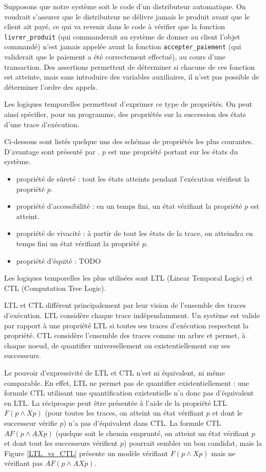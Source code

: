 Supposons que notre système soit le code d'un distributeur automatique.
On voudrait s'assurer que le distributeur ne délivre jamais le produit
avant que le client ait payé, ce qui va revenir dans le code à vérifier
que la fonction \lstinline!livrer_produit! (qui commanderait au système
de donner au client l'objet commandé) n'est jamais appelée avant la
fonction \lstinline!accepter_paiement! (qui validerait que le paiement a
été correctement effectué), au cours d'une transaction. Des assertions
permettent de déterminer si chacune de ces fonction est atteinte, mais
sans introduire des variables auxiliaires, il n'est pas possible de
déterminer l'ordre des appels.

Les logiques temporelles permettent d'exprimer ce type de propriétés. On
peut ainsi spécifier, pour un programme, des propriétés sur la
succession des états d'une trace d'exécution.

Ci-dessous sont listés quelque uns des schémas de propriétés les plus
courantes. D'avantage sont présenté par \citep{LTL_scheme}. \(p\) est une
propriété portant sur les états du système.

\begin{itemize}
\item
  propriété de sûreté : tout les états atteints pendant l'exécution
  vérifient la propriété \(p\).
\item
  propriété d'accessibilité : en un temps fini, un état vérifiant la
  propriété \(p\) est atteint.
\item
  propriété de vivacité : à partir de tout les états de la trace, on
  atteindra en temps fini un état vérifiant la propriété \(p\).
\item
  propriété d'équité : TODO
\end{itemize}

Les logiques temporelles les plus utilisées sont LTL (Linear Temporal
Logic) et CTL (Computation Tree Logic).

LTL et CTL différent principalement par leur vision de l'ensemble des
traces d'exécution. LTL considère chaque trace indépendamment. Un
système est valide par rapport à une propriété LTL si toutes ses traces
d'exécution respectent la propriété. CTL considère l'ensemble des traces
comme un arbre et permet, à chaque noeud, de quantifier universellement
ou existentiellement sur ses successeurs.

Le pouvoir d'expressivité de LTL et CTL n'est ni équivalent, ni même comparable.
En effet, LTL ne permet pas de quantifier existentiellement : une formule CTL
utilisant une quantification existentielle n'a donc pas d'équivalent en LTL. La
réciproque peut être présentée à l'aide de la propriété LTL \(F (p \land X p)\)
(pour toutes les traces, on atteint un état vérifiant \(p\) et dont le
successeur vérifie \(p\)) n'a pas d'équivalent dans CTL. La formule CTL \(AF (p
\land AX p)\) (quelque soit le chemin emprunté, on atteint un état vérifiant
\(p\) et dont tout les successeurs vérifient \(p\)) pourrait sembler un bon
candidat, mais la Figure \ref{LTL_vs_CTL} présente un modèle vérifiant
\(F (p \land X p)\) mais ne vérifiant pas \(AF (p \land AX p)\).

